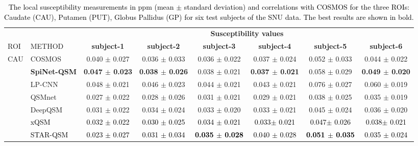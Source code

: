 \documentclass[sn-vancouver,Numbered]{sn-jnl}%
\begin{document}
\begin{table}[htbp]
\centering
\caption{\textcolor{black}{The local susceptibility measurements in ppm (mean $\pm$ standard deviation) and correlations with COSMOS for the three ROIs: Caudate (CAU), Putamen (PUT), Globus Pallidus (GP) for six test subjects of the SNU data. The best results are shown in bold.}}
\addtolength{\tabcolsep}{1pt}
{\small
\begin{tabular}{llcccccc}
\hline

& 
&\multicolumn{6}{c}{\textbf{Susceptibility values }} \\ 
\cmidrule{3-8}

ROI
&METHOD                  
&\textbf{subject-1}     
&\textbf{subject-2}        
&\textbf{subject-3}       
&\textbf{subject-4}  
&\textbf{subject-5}       
&\textbf{subject-6}  
\\ \hline


\multirow{5}{*}{CAU}        
& COSMOS   
&0.040 $\pm$ 0.027
&0.036 $\pm$ 0.033
&0.036 $\pm$ 0.022
&0.037 $\pm$ 0.024
&0.052 $\pm$ 0.033
&0.044 $\pm$ 0.022 \\ 

& \textbf{SpiNet-QSM}   
&\textbf{0.047 $\pm$ 0.023}
&\textbf{0.038 $\pm$ 0.026}
&0.038 $\pm$ 0.021
&\textbf{0.037 $\pm$ 0.021}
&0.058 $\pm$ 0.029
&\textbf{0.049 $\pm$ 0.020} \\ 

& LP-CNN                
&0.048 $\pm$ 0.021
&0.046 $\pm$ 0.023
&0.044 $\pm$ 0.021
&0.043 $\pm$ 0.021
&0.076 $\pm$ 0.027
&0.060 $\pm$ 0.019\\ 

& QSMnet                
&0.027 $\pm$ 0.022
&0.028 $\pm$ 0.026
&0.031 $\pm$ 0.021
&0.029 $\pm$ 0.021
&0.038 $\pm$ 0.025
&0.035 $\pm$ 0.019\\ 

& DeepQSM               
&0.031 $\pm$ 0.022
&0.034 $\pm$ 0.024
&0.033 $\pm$ 0.020
&0.033 $\pm$ 0.021
&0.045 $\pm$ 0.024
&0.036 $\pm$ 0.020 \\ 

&\textcolor{black}{xQSM}               
&\textcolor{black}{0.032 $\pm$ 0.022}
&\textcolor{black}{0.030 $\pm$ 0.025}
&\textcolor{black}{0.034 $\pm$ 0.021}
&\textcolor{black}{0.033$\pm$ 0.021}
&\textcolor{black}{0.047$\pm$ 0.026}
&\textcolor{black}{0.038$\pm$ 0.021}\\ 

& \textcolor{black}{STAR-QSM}               
&\textcolor{black}{0.023 $\pm$ 0.027}
&\textcolor{black}{0.031 $\pm$ 0.034}
&\textcolor{black}{\textbf{0.035 $\pm$ 0.028}}
&\textcolor{black}{0.040 $\pm$ 0.028}
&\textcolor{black}{\textbf{0.051 $\pm$ 0.035}}
&\textcolor{black}{0.035 $\pm$ 0.024} \\ 




\end{tabular}}
\end{table}
\end{document}

